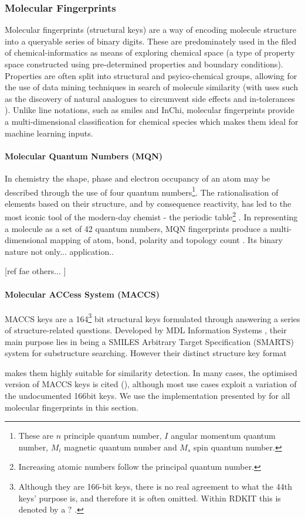 \subsubsection{Molecular Fingerprints}\label{sec:fingerprints}
Molecular fingerprints (structural keys) are a way of encoding molecule structure into a queryable series of binary digits. These are predominately used in the filed of chemical-informatics as means of exploring chemical space (a type of property space constructed using pre-determined properties and boundary conditions). Properties are often split into structural and psyico-chemical groups, allowing for the use of data mining techniques in search of molecule similarity (with uses such as the discovery of natural analogues to circumvent side effects and in-tolerances \citep{analog}). Unlike line notations, such as smiles and InChi, molecular fingerprints provide a multi-dimensional classification for chemical species which makes them ideal for machine learning inputs.

\paragraph{Molecular Quantum Numbers (MQN)}
In chemistry the shape, phase and electron occupancy of an atom may be described through the use of four quantum numbers\footnote{These are $n$ principle quantum number, $I$ angular momentum quantum number, $M_i$ magnetic quantum number and $M_s$ spin quantum number.}. The rationalisation of elements based on their structure, and by consequence reactivity, has led to the most iconic tool of the modern-day chemist - the periodic table\footnote{Increasing atomic numbers follow the principal quantum number.} \citep{periodic}. In representing a molecule as a set of 42 quantum numbers, MQN fingerprints produce a multi-dimensional mapping of atom, bond, polarity and topology count \citep{MQN}. Its binary nature not only... application..

[ref fae others... ]

\paragraph{Molecular ACCess System (MACCS)}
MACCS keys are a 164\footnote{Although they are 166-bit keys, there is no real agreement to what the 44th keys' purpose is, and therefore it is often omitted. Within RDKIT this is denoted by a $?$ \citep{rdkitcode}.} bit structural keys formulated through answering a series of structure-related questions. Developed by MDL Information Systems \citep{maccs}, their main purpose lies in being a SMILES Arbitrary Target Specification (SMARTS) system for substructure searching. However their distinct structure key format

makes them highly suitable for similarity detection. In many cases, the optimised version of MACCS keys is cited (\citep{optimised}), although most use cases exploit a variation of the undocumented 166bit keys. We use the implementation presented by \citep{rdkit,rdkitcode} for all molecular fingerprints in this section.
